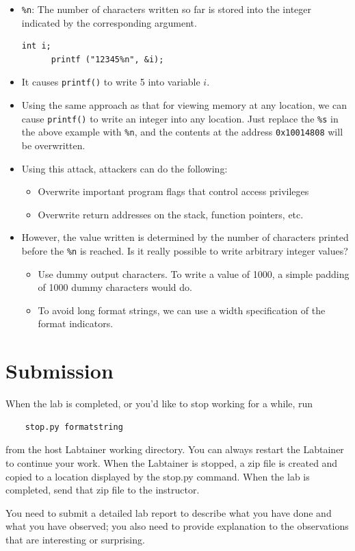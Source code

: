    \begin{itemize}
   \item {\tt \%n}: The number of characters written so far is stored into the
   integer indicated by the corresponding argument.
   \begin{Verbatim}[frame=single]
      int i;
      printf ("12345%n", &i);
   \end{Verbatim}
   \item It causes {\tt printf()} to write 5 into variable $i$.

   \item Using the same approach as that for viewing memory at any location, we
   can cause {\tt printf()} to write an integer into any location. Just replace
   the \verb|%s| in the above example with \verb|%n|, and the contents at the
   address \verb|0x10014808| will be overwritten.

   \item Using this attack, attackers can do the following:
       \begin{itemize}
       \item Overwrite important program flags that control access privileges
       \item Overwrite return addresses on the stack, function pointers, etc.
       \end{itemize}

   \item However, the value written is determined by the number of characters
   printed before the {\tt \%n} is reached. Is it really possible to write
   arbitrary integer values?
       \begin{itemize}
       \item Use dummy output characters. To write a value of 1000, a simple
       padding of 1000 dummy characters would do.
       \item To avoid long format strings, we can use a width specification of
       the format indicators.
       \end{itemize}
   \end{itemize}







\section{Submission}
When the lab is completed, or you'd like to stop working for a while, run
\begin{verbatim}
    stop.py formatstring
\end{verbatim}

from the host Labtainer working directory.  You can always restart the
Labtainer to continue your work.  When the Labtainer is stopped, a
zip file is created and copied to a location displayed by the stop.py
command.  When the lab is completed, send that zip file to the instructor.

You need to submit a detailed lab report to describe what you have
done and what you have observed; you also need to provide explanation
to the observations that are interesting or surprising.



